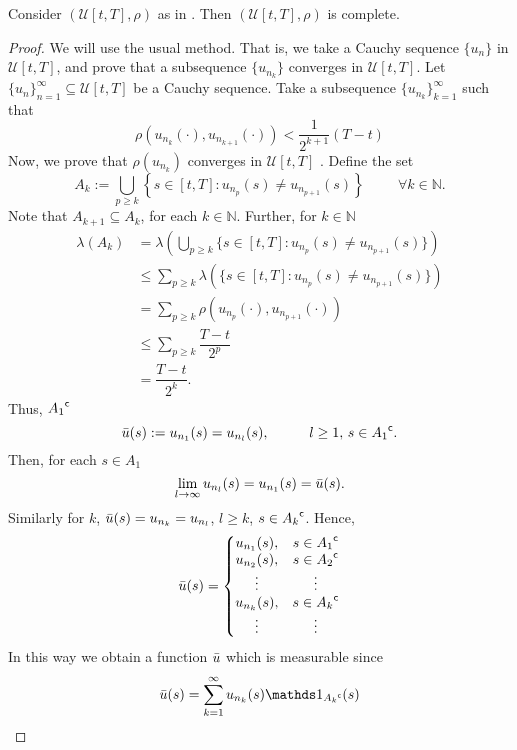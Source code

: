 \begin{lemma}\label{Lemma_ucompleteMS}
    Consider $(\mathscr{U}[t,T], \rho) $ as in . Then
    $(\mathscr{U}[t,T], \rho) $ is complete.
\end{lemma}
\begin{proof}
    We will use the usual method. That is, we take a Cauchy sequence  $\{u_n\}$
    in $\mathscr{U}[t,T]$, and prove that a subsequence $\{u_{n_k}\}$ converges in
    $\mathscr{U}[t,T]$.
    Let $\{u_n\}_{n=1}^{\infty} \subseteq \mathscr{U}[t,T]$ be a Cauchy sequence.
    Take a subsequence $\{u_{n_k}\}_{k=1}^{\infty}$ such that 
    $$
        \rho(u_{n_k}(\cdot), u_{n_{k+1}}(\cdot)) < \dfrac{1}{2^{k+1}}(T-t)
    $$
    Now, we prove that $\rho(u_{n_k})$ converges in $\mathscr{U}[t,T]$ . Define the
    set
    $$
        A_{k} := \bigcup_{p \geq k}\left\{ s\in[t,T] : u_{n_p}(s) \neq u_{n_{p+1}}(s)%
            \right\} \hspace{1cm} \forall k \in \mathbb{N}.
    $$
    Note that $A_{k+1} \subseteq A_k$, for each $k \in \mathbb{N}$. Further, for
    $k \in \mathbb{N}$
    \begin{align*}
        \lambda(A_k) 
            &= \lambda \left(\bigcup_{p \geq k} \{s\in[t,T] : u_{n_p}(s) %
                \neq u_{n_{p+1}}(s)\}\right) \\
            &\leq \sum_{p \geq k} \lambda(\{s\in[t,T] : u_{n_p}(s) \neq %
                u_{n_{p+1}}(s)\}) \\
            &= \sum_{p \geq k} \rho(u_{n_p}(\cdot), u_{n_{p+1}}(\cdot)) \\
            &\leq \sum_{p \geq k}\dfrac{T-t}{2^{p}} \\
            &= \dfrac{T-t}{2^{k}}. 
    \end{align*}
    Thus, ${A_1}^{\mathsf{c}}$
    $$
        \Bar{u}(s) := u_{n_{1}}(s) = u_{n_{l}}(s), \hspace{1cm} l \geq 1, \, s \in {A_1}^{\mathsf{c}}.
    $$
    Then, for each $s \in A_1$
    $$
        \lim_{l \to \infty} u_{n_l}(s) = u_{n_1}(s) = \Bar{u}(s).
    $$
    Similarly for $k$, $\Bar{u}(s) = u_{n_k} = u_{n_l}$, $l \geq k$, $s \in {A_{k}}^{\mathsf{c}}$.
    Hence,
    \begin{equation*}
        \Bar{u}(s) = \left\{
        \begin{matrix} 
            u_{n_1}(s), & s\in {A_1}^{\mathsf{c}} \\
            u_{n_2}(s), & s\in {A_2}^{\mathsf{c}} \\
            \vdots      & \vdots \\
            u_{n_k}(s), & s \in {A_k}^{\mathsf{c}} \\
            \vdots      & \vdots 
        \end{matrix}
        \right. 
    \end{equation*}
    In this way we obtain a function $\Bar{u}$ which is measurable since
    $$
        \Bar{u}(s) = \sum_{k=1}^{\infty}u_{n_k}(s) \ind_{\stcomp{A_k}}(s)
    $$
\end{proof}

